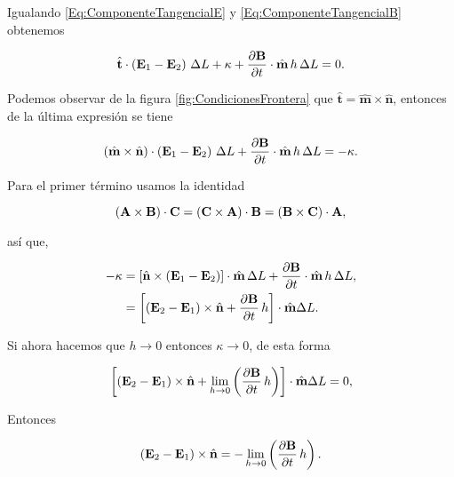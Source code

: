 Igualando \eqref{Eq:ComponenteTangencialE} y \eqref{Eq:ComponenteTangencialB} obtenemos

\begin{equation}
	\hat{\textbf{t}} \cdot \left( \E_{1} - \E_{2} \right) \, \Delta L + \kappa + \diffp{\B}{t} \cdot  \hat{\textbf{m}} \, h\, \Delta L = 0.
\end{equation}

Podemos observar de la figura \ref{fig:CondicionesFrontera} que $\hat{\textbf{t}} = \hat{\textbf{m}} \times  \hat{\textbf{n}}$, entonces de la última expresión se tiene

\begin{equation}
	\left( \hat{\textbf{m}} \times  \hat{\textbf{n}} \right) \cdot \left( \E_{1} - \E_{2} \right) \, \Delta L + \diffp{\B}{t} \cdot  \hat{\textbf{m}} \, h \, \Delta L = -\kappa.
\end{equation}

Para el primer término usamos la identidad

\begin{equation}
	\left( \textbf{A} \times \textbf{B} \right) \cdot \textbf{C} = \left( \textbf{C} \times \textbf{A} \right) \cdot \textbf{B} = \left( \textbf{B}  \times \textbf{C}  \right) \cdot \textbf{A},
\end{equation}

así que,

\begin{align*}
	-\kappa & = \left[ \hat{\textbf{n} } \times \left( \E_{1} - \E_{2} \right) \right] \cdot  \hat{\textbf{m}} \, \Delta L + \diffp{\B}{t} \cdot  \hat{\textbf{m}} \, h \,\Delta L, \\
	        & = \left[ \left( \E_{2} - \E_{1} \right) \times \hat{\textbf{n}} + \diffp{\B}{t} \, h \right] \cdot  \hat{\textbf{m}} \Delta L.
\end{align*}

Si ahora hacemos que $h\rightarrow 0$ entonces $\kappa\rightarrow 0$, de esta forma

\begin{equation}
	\left[ \left( \E_{2} - \E_{1} \right) \times \hat{\textbf{n}} + \lim_{h\rightarrow 0} \left( \diffp{\B}{t} \, h \right) \right] \cdot  \hat{\textbf{m}} \Delta L = 0,
\end{equation}

Entonces

\begin{equation}
	\label{Eq:CondicionesFronteraTangencial}
	\left( \E_{2} - \E_{1} \right) \times \hat{\textbf{n}} = -\lim_{h\rightarrow 0} \left( \diffp{\B}{t} \, h \right).
\end{equation}


